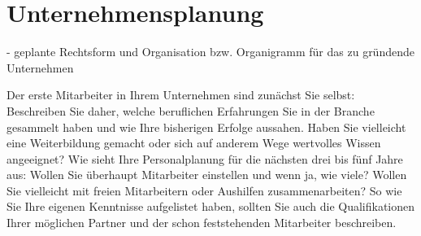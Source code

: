 
\section{Unternehmensplanung}


- geplante Rechtsform und Organisation bzw. Organigramm für das zu gründende Unternehmen

Der erste Mitarbeiter in Ihrem Unternehmen sind zunächst Sie selbst: Beschreiben Sie daher, welche beruflichen Erfahrungen Sie in der Branche gesammelt haben und wie Ihre bisherigen Erfolge aussahen. Haben Sie vielleicht eine Weiterbildung gemacht oder sich auf anderem Wege wertvolles Wissen angeeignet? Wie sieht Ihre Personalplanung für die nächsten drei bis fünf Jahre aus: Wollen Sie überhaupt Mitarbeiter einstellen und wenn ja, wie viele? Wollen Sie vielleicht mit freien Mitarbeitern oder Aushilfen zusammenarbeiten? So wie Sie Ihre eigenen Kenntnisse aufgelistet haben, sollten Sie auch die Qualifikationen Ihrer möglichen Partner und der schon feststehenden Mitarbeiter beschreiben.

